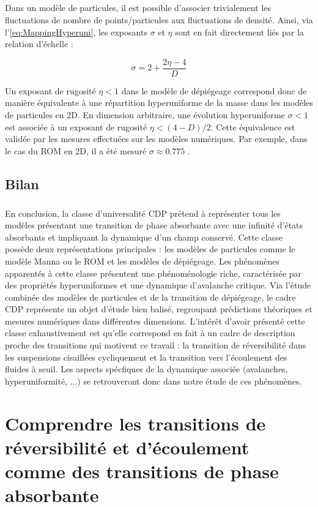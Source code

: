 \subparagraph{}Dans un modèle de particules, il est possible d'associer trivialement les fluctuations de nombre de points/particules aux fluctuations de densité. Ainsi, via l'\autoref{eq:MappingHyperuni}, les exposants $\sigma$ et $\eta$ sont en fait directement liés par la relation d'échelle :

\begin{equation}
	\sigma = 2 + \frac{2\eta - 4}{D}
\end{equation}

\noindent Un exposant de rugosité $\eta < 1$ dans le modèle de dépiégeage correspond donc de manière équivalente à une répartition hyperuniforme de la masse dans les modèles de particules en 2D. En dimension arbitraire, une évolution hyperuniforme $\sigma < 1$ est associée à un exposant de rugosité $\eta < (4-D)/2$. Cette équivalence est validée par les mesures effectuées sur les modèles numériques. Par exemple, dans le cas du ROM en 2D, il a été mesuré $\sigma \approx 0.775$ \cite{tjhung_hyperuniform_2015, hexner_hyperuniformity_2015, weijs_emergent_2015}.

\subsection{Bilan}

\subparagraph{}En conclusion, la classe d'universalité CDP prétend à représenter tous les modèles présentant une transition de phase absorbante avec une infinité d'états absorbants et impliquant la dynamique d'un champ conservé. Cette classe possède deux représentations principales : les modèles de particules comme le modèle Manna ou le ROM et les modèles de dépiégeage. Les phénomènes apparentés à cette classe présentent une phénoménologie riche, caractérisée par des propriétés hyperuniformes et une dynamique d'avalanche critique. Via l'étude combinée des modèles de particules et de la transition de dépiégeage, le cadre CDP représente un objet d'étude bien balisé, regroupant prédictions théoriques et mesures numériques dans différentes dimensions. L'intérêt d'avoir présenté cette classe exhaustivement est qu'elle correspond en fait à un cadre de description proche des transitions qui motivent ce travail : la transition de réversibilité dans les suspensions cisaillées cycliquement et la transition vers l'écoulement des fluides à seuil. Les aspects spécfiques de la dynamique associée (avalanches, hyperuniformité, ...) se retrouveront donc dans notre étude de ces phénomènes.

\section{Comprendre les transitions de réversibilité et d'écoulement comme des transitions de phase absorbante}

